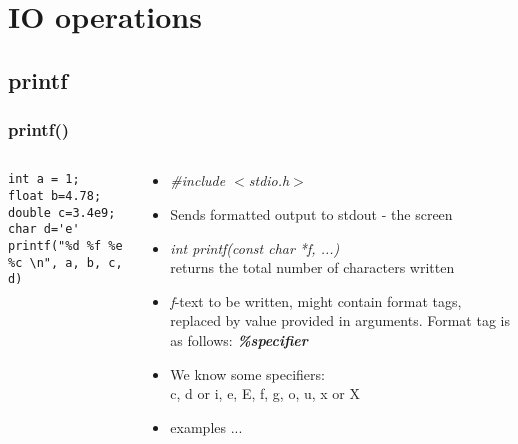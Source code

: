 \documentclass[10pt]{beamer}
\begin{document}
\section{IO operations}
\subsection{printf}

\begin{frame}[fragile]
  \frametitle{printf()}
  \begin{columns}
    \begin{column}{0.5\textwidth}
\begin{lstlisting}
int a = 1;
float b=4.78;
double c=3.4e9;
char d='e'
printf("%d %f %e %c \n", a, b, c, d)
\end{lstlisting}
    \end{column}
    \begin{column}{0.5\textwidth}
      \begin{itemize}
        \item \textit{\#include $<$stdio.h$>$}
        \item Sends formatted output to stdout - the screen
        \item \textit{int printf(const char *f, ...)}\\
        returns the total number of characters written
        \item \textit{f}-text to be written, might contain format tags, replaced by value provided in arguments. Format tag is as follows: \textit{\textbf{\%specifier}}
        \item We know some specifiers:\\
        c, d or i, e, E, f, g, o, u, x or X
        \item examples ...
      \end{itemize}
    \end{column}
  \end{columns}
\end{frame}
\end{document}
